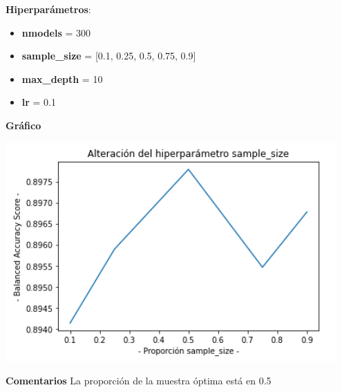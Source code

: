 \documentclass[conference,a4paper]{IEEEtran}
\begin{document}
\begin{textb}
    \textbf{Hiperparámetros}:
  \begin{itemize}
      \item \textbf{nmodels} = 300
      \item \textbf{sample\_size} = [0.1, 0.25, 0.5, 0.75, 0.9]
      \item \textbf{max\_depth} = 10
      \item \textbf{lr} = 0.1
  \end{itemize}
  \textbf{Gráfico}
  
  \begin{center}
    \includegraphics[scale=0.80]{figures/samplesize_adultDataset_trees.png}
    \label{fig:funcion_clasificacion}
  \end{center}
  
  \textbf{Comentarios} La proporción de la muestra óptima está en 0.5
\end{textb}
\end{document}
